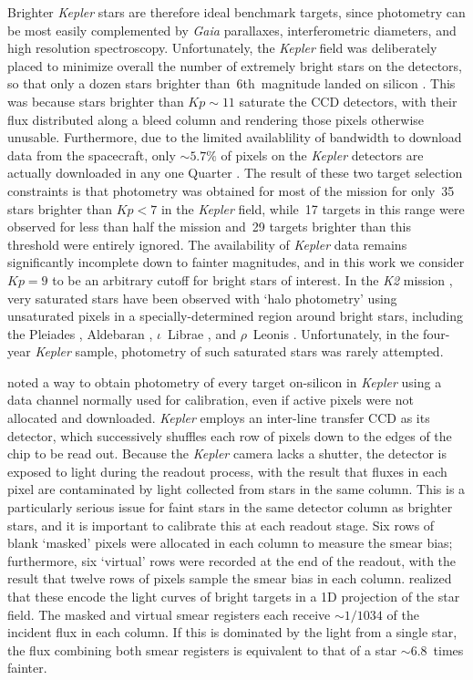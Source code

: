 \documentclass[a4paper,fleqn,usenatbib]{mnras}
\newcommand{\kepler}{\textit{Kepler}\xspace}
\newcommand{\ktwo}{\textit{K2}\xspace}
\newcommand{\gaia}{\textit{Gaia}\xspace}
\begin{document}
Brighter \kepler stars are therefore ideal benchmark targets, since photometry can be most easily complemented by \gaia parallaxes, interferometric diameters, and high resolution spectroscopy.  
Unfortunately, the \kepler field was deliberately placed to minimize overall the number of extremely bright stars on the detectors, so that only a dozen stars brighter than~6th~magnitude landed on silicon \citep{2010ApJ...713L..79K}. This was because stars brighter than $Kp \sim 11$ saturate the CCD detectors, with their flux distributed along a bleed column and rendering those pixels otherwise unusable. Furthermore, due to the limited availablility of bandwidth to download data from the spacecraft, only $\sim 5.7\%$ of pixels on the \kepler detectors are actually downloaded in any one Quarter \citep{2010ApJ...713L..87J}. The result of these two target selection constraints is that photometry was obtained for most of the mission for only~35 stars brighter than $Kp<7$ in the \kepler field, while~17 targets in this range were observed for less than half the mission and~29 targets brighter than this threshold were entirely ignored. The availability of \kepler data remains significantly incomplete down to fainter magnitudes, and in this work we consider $Kp=9$ to be an arbitrary cutoff for bright stars of interest. In the \ktwo mission \citep{k2early}, very saturated stars have been observed with `halo photometry' using unsaturated pixels in a specially-determined region around bright stars, including the Pleiades \citep{halo}, Aldebaran \citep{aldebaran}, $\iota$~Librae \citep{Buysschaert2018}, and $\rho$~Leonis \citep{rholeo}. Unfortunately, in the four-year \kepler sample, photometry of such saturated stars was rarely attempted.

\citet{orig_smear} noted a way to obtain photometry of every target on-silicon in \kepler using a data channel normally used for calibration, even if active pixels were not allocated and downloaded. \kepler employs an inter-line transfer CCD as its detector, which successively shuffles each row of pixels down to the edges of the chip to be read out. Because the \kepler camera lacks a shutter, the detector is exposed to light during the readout process, with the result that fluxes in each pixel are contaminated by light collected from stars in the same column. This is a particularly serious issue for faint stars in the same detector column as brighter stars, and it is important to calibrate this at each readout stage. Six rows of blank `masked' pixels were allocated in each column to measure the smear bias; furthermore, six `virtual' rows were recorded at the end of the readout, with the result that twelve rows of pixels sample the smear bias in each column. \citet{orig_smear} realized that these encode the light curves of bright targets in a 1D projection of the star field. The masked and virtual smear registers each receive $\sim 1/1034$ of the incident flux in each column. If this is dominated by the light from a single star, the flux combining both smear registers is equivalent to that of a star $\sim 6.8$~times fainter. 
\end{document}
